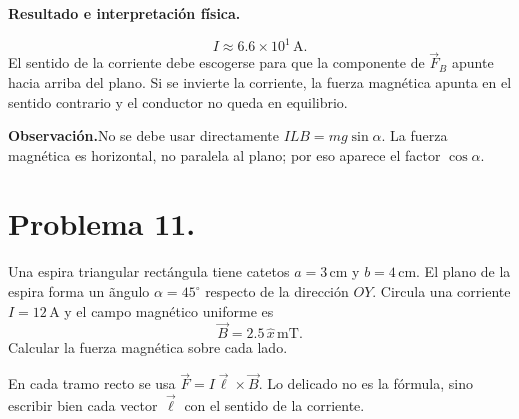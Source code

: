 \documentclass[11pt]{article}
\begin{document}
\par\medskip\noindent\textbf{Resultado e interpretación física.}\par\smallskip
\begin{equation*}
    \boxed{I\approx6.6\times10^1\,\mathrm A}.
\end{equation*}
El sentido de la corriente debe escogerse para que la componente de $\vec F_B$ apunte hacia arriba del plano. Si se invierte la corriente, la fuerza magn\'etica apunta en el sentido contrario y el conductor no queda en equilibrio.

\par\medskip\noindent\textbf{Observación.}\enspace No se debe usar directamente $ILB=mg\sin\alpha$. La fuerza magn\'etica es horizontal, no paralela al plano; por eso aparece el factor $\cos\alpha$.\par\medskip 

\newpage

\section*{Problema 11.}
Una espira triangular rect\'angula tiene catetos $a=3\,\mathrm{cm}$ y $b=4\,\mathrm{cm}$. El plano de la espira forma un \~angulo $\alpha=45^\circ$ respecto de la direcci\'on $OY$. Circula una corriente $I=12\,\mathrm A$ y el campo magn\'etico uniforme es
\begin{equation*}
    \vec B=2.5\,\hat x\,\mathrm{mT}.
\end{equation*}
Calcular la fuerza magn\'etica sobre cada lado.

\par\medskip\noindent En cada tramo recto se usa $\vec F=I\vec\ell\times\vec B$. Lo delicado no es la f\'ormula, sino escribir bien cada vector $\vec\ell$ con el sentido de la corriente.\par\medskip 
\end{document}
